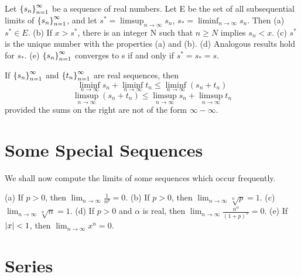 \begin{theorem} %
  \label{thm:chap3:lim_sup_inf_props}
  Let $\left\{ s_n \right\}_{n=1}^\infty$ be a sequence of real numbers. Let E be the set
  of all subsequential limits of $\left\{ s_n \right\}_{n=1}^\infty$, and let $s^* =
  \limsup_{n \to \infty} s_n$, $s_* = \liminf_{n \to \infty} s_n$. Then
  (a) $s^* \in E$.
  (b) If $x > s^*$, there is an integer N such that $n \ge N$ implies $s_n < x$.
  (c) $s^*$ is the unique number with the properties (a) and (b).
  (d) Analogous results hold for $s_*$.
  (e) $\left\{ s_n \right\}_{n=1}^\infty$ converges to s if and only if $s^* = s_* = s$.
\end{theorem}



\begin{theorem} %
  \label{thm:chap3:limsup_sum}
  If $\left\{ s_n \right\}_{n=1}^\infty$ and $\left\{ t_n \right\}_{n=1}^\infty$ are real sequences, then
  \[ \liminf_{n \to \infty} s_n + \liminf_{n \to \infty} t_n \le
  \liminf_{n \to \infty} (s_n + t_n) \]
  \[ \limsup_{n \to \infty} (s_n + t_n) \le \limsup_{n \to \infty}
  s_n + \limsup_{n \to \infty} t_n \]
  provided the sums on the right are not of the form $\infty - \infty$.
\end{theorem}

\section{Some Special Sequences}
\label{sec:chap3:special_sequences}

We shall now compute the limits of some sequences which occur frequently.

\begin{theorem} %
  \label{thm:chap3:special_limits}
  (a) If $p > 0$, then $\lim_{n \to \infty} \frac{1}{n^p} = 0$.
  (b) If $p > 0$, then $\lim_{n \to \infty} \sqrt[n]{p} = 1$.
  (c) $\lim_{n \to \infty} \sqrt[n]{n} = 1$.
  (d) If $p > 0$ and $\alpha$ is real, then $\lim_{n \to \infty}
  \frac{n^\alpha}{(1+p)^n} = 0$.
  (e) If $\left\lvert x \right\rvert < 1$, then $\lim_{n \to \infty} x^n = 0$.
\end{theorem}

\section{Series}
\label{sec:chap3:series}

